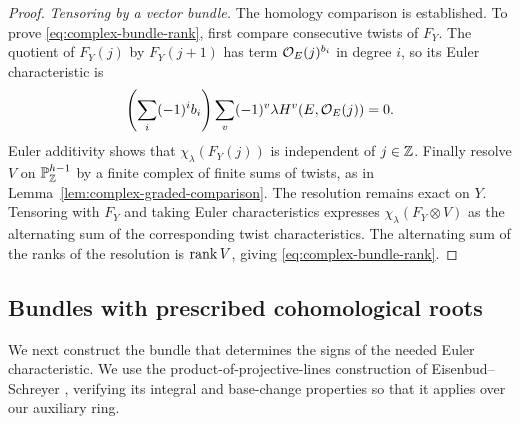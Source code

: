 \begin{proof}
\smallskip
\noindent\emph{Tensoring by a vector bundle.}
The homology comparison is established. To prove
\eqref{eq:complex-bundle-rank}, first compare consecutive twists
of $F_Y$. The quotient of $F_Y(j)$ by $F_Y(j+1)$ has term
$\mathcal O_E(j)^{b_i}$ in degree $i$, so its Euler characteristic is
\[
 \left(\sum_i(-1)^i b_i\right)
 \sum_v(-1)^v\lambda H^v(E,\mathcal O_E(j))=0.
\]
Euler additivity shows that $\chi_\lambda(F_Y(j))$ is independent of
$j\in\mathbb Z$. Finally resolve $V$ on $\mathbb P_\mathbb Z^{h-1}$ by a finite complex
of finite sums of twists, as in
Lemma~\ref{lem:complex-graded-comparison}. The resolution remains exact
on $Y$. Tensoring with $F_Y$ and taking Euler characteristics expresses
$\chi_\lambda(F_Y\otimes V)$ as the alternating sum of the corresponding
twist characteristics. The alternating sum of the ranks of the resolution
is $\operatorname{rank} V$, giving \eqref{eq:complex-bundle-rank}.
\end{proof}

\subsection{Bundles with prescribed cohomological roots}

We next construct the bundle that determines the signs of the needed
Euler characteristic. We use the product-of-projective-lines
construction of Eisenbud--Schreyer
\cite[Theorem~6.1]{EisenbudSchreyer}, verifying its integral and
base-change properties so that it applies over our auxiliary ring.

